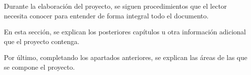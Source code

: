 
Durante la elaboración del proyecto, se siguen procedimientos que el lector necesita conocer para entender de forma integral todo el documento.


En esta sección, se explican los posteriores capítulos u otra información adicional que el proyecto contenga.


Por último, completando los apartados anteriores, se explican las áreas de las que se compone el proyecto.

\chapterend
